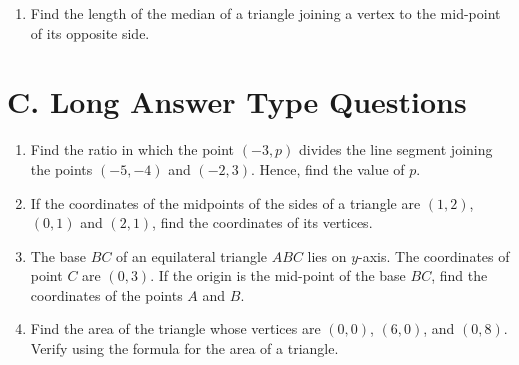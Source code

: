 \documentclass[12pt]{article}
\begin{document}
\begin{multicols}{2}
\begin{enumerate}
		\item Find the length of the median of a triangle joining a vertex to the mid-point of its opposite side.
	\end{enumerate}
	
	\section*{C. Long Answer Type Questions}
	
	\begin{enumerate}
		\item Find the ratio in which the point $(-3, p)$ divides the line segment joining the points $(-5, -4)$ and $(-2, 3)$. Hence, find the value of $p$.
		
		\item If the coordinates of the midpoints of the sides of a triangle are $(1, 2)$, $(0, 1)$ and $(2, 1)$, find the coordinates of its vertices.
		
		\item The base $BC$ of an equilateral triangle $ABC$ lies on $y$-axis. The coordinates of point $C$ are $(0, 3)$. If the origin is the mid-point of the base $BC$, find the coordinates of the points $A$ and $B$.
		
		\item Find the area of the triangle whose vertices are $(0, 0)$, $(6, 0)$, and $(0, 8)$. Verify using the formula for the area of a triangle.
	\end{enumerate}
	
	\end{multicols}
	\center{******************}
	
\end{document}
